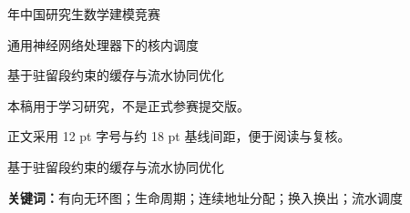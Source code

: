 \documentclass[fontset=windows,12pt,a4paper]{ctexart}
\begin{document}
\begin{titlepage}\centering
\vspace*{1.5cm}
{ 年中国研究生数学建模竞赛\par}
\vspace{1.7cm}
{\heiti 通用神经网络处理器下的核内调度\par}
\vspace{1cm}
{\heiti 基于驻留段约束的缓存与流水协同优化\par}
\vfill
本稿用于学习研究，不是正式参赛提交版。\par
正文采用 12 pt 字号与约 18 pt 基线间距，便于阅读与复核。\par
\end{titlepage}
\setcounter{page}{1}
\begin{center}{\heiti 基于驻留段约束的缓存与流水协同优化}\par
{}\end{center}

\par\noindent\textbf{关键词：}有向无环图；生命周期；连续地址分配；换入换出；流水调度
\clearpage










\appendix
{}

\end{document}
